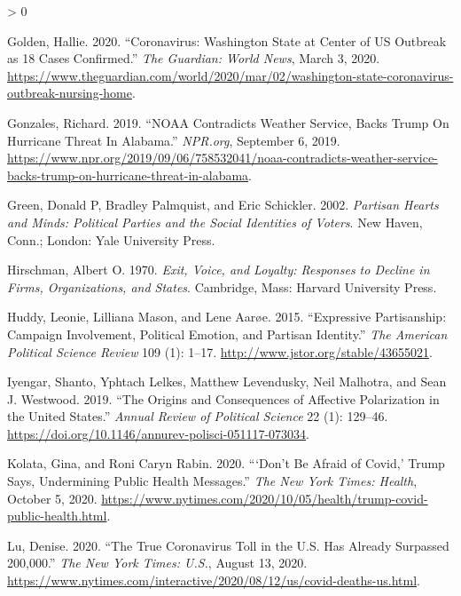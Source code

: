 \documentclass[
  12pt,
]{article}
\newlength{\cslhangindent}
\newenvironment{CSLReferences}[2] %
 {%
  \setlength{\parindent}{0pt}
  \ifodd #1 \everypar{\setlength{\hangindent}{\cslhangindent}}\ignorespaces\fi
  \ifnum #2 > 0
  \setlength{\parskip}{#2\baselineskip}
  \fi
 }%
 {}
\begin{document}
\begin{CSLReferences}{1}{0}
\leavevmode\hypertarget{ref-Golden2020}{}%
Golden, Hallie. 2020. {``Coronavirus: {Washington} State at Center of {US} Outbreak as 18 Cases Confirmed.''} \emph{The Guardian: World News}, March 3, 2020. \url{https://www.theguardian.com/world/2020/mar/02/washington-state-coronavirus-outbreak-nursing-home}.

\leavevmode\hypertarget{ref-Gonzales2019}{}%
Gonzales, Richard. 2019. {``{NOAA Contradicts Weather Service}, {Backs Trump On Hurricane Threat In Alabama}.''} \emph{NPR.org}, September 6, 2019. \url{https://www.npr.org/2019/09/06/758532041/noaa-contradicts-weather-service-backs-trump-on-hurricane-threat-in-alabama}.

\leavevmode\hypertarget{ref-Green2002}{}%
Green, Donald P, Bradley Palmquist, and Eric Schickler. 2002. \emph{Partisan Hearts and Minds: Political Parties and the Social Identities of Voters}. {New Haven, Conn.; London}: {Yale University Press}.

\leavevmode\hypertarget{ref-Hirschman1970a}{}%
Hirschman, Albert O. 1970. \emph{Exit, Voice, and Loyalty: Responses to Decline in Firms, Organizations, and States}. {Cambridge, Mass}: {Harvard University Press}.

\leavevmode\hypertarget{ref-Huddy2015}{}%
Huddy, Leonie, Lilliana Mason, and Lene Aarøe. 2015. {``Expressive {Partisanship}: {Campaign Involvement}, {Political Emotion}, and {Partisan Identity}.''} \emph{The American Political Science Review} 109 (1): 1--17. \url{http://www.jstor.org/stable/43655021}.

\leavevmode\hypertarget{ref-Iyengar2019}{}%
Iyengar, Shanto, Yphtach Lelkes, Matthew Levendusky, Neil Malhotra, and Sean J. Westwood. 2019. {``The {Origins} and {Consequences} of {Affective Polarization} in the {United States}.''} \emph{Annual Review of Political Science} 22 (1): 129--46. \url{https://doi.org/10.1146/annurev-polisci-051117-073034}.

\leavevmode\hypertarget{ref-Kolata2020}{}%
Kolata, Gina, and Roni Caryn Rabin. 2020. {``{`{Don}'t {Be Afraid} of {Covid},'} {Trump Says}, {Undermining Public Health Messages}.''} \emph{The New York Times: Health}, October 5, 2020. \url{https://www.nytimes.com/2020/10/05/health/trump-covid-public-health.html}.

\leavevmode\hypertarget{ref-Lu2020}{}%
Lu, Denise. 2020. {``The {True Coronavirus Toll} in the {U}.{S}. {Has Already Surpassed} 200,000.''} \emph{The New York Times: U.S.}, August 13, 2020. \url{https://www.nytimes.com/interactive/2020/08/12/us/covid-deaths-us.html}.


\end{CSLReferences}
\end{document}

